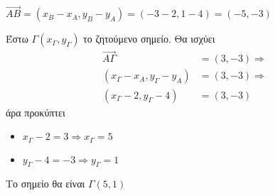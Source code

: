 \begin{alist}
\item $ \overrightarrow{AB}=(x_B-x_A,y_B-y_A)=(-3-2,1-4)=(-5,-3) $
\item Έστω $ \varGamma(x_{\varGamma},y_{\varGamma}) $ το ζητούμενο σημείο. Θα ισχύει
\begin{align*}
\overrightarrow{A\varGamma}&=(3,-3)\Rightarrow\\
(x_{\varGamma}-x_A,y_{\varGamma}-y_A)&=(3,-3)\Rightarrow\\
(x_{\varGamma}-2,y_{\varGamma}-4)&=(3,-3)
\end{align*}
άρα προκύπτει
\begin{itemize}
\item $ x_{\varGamma}-2=3\Rightarrow x_{\varGamma}=5 $
\item $ y_{\varGamma}-4=-3\Rightarrow y_{\varGamma}=1 $
\end{itemize}
Το σημείο θα είναι $ \varGamma(5,1) $
\end{alist}

